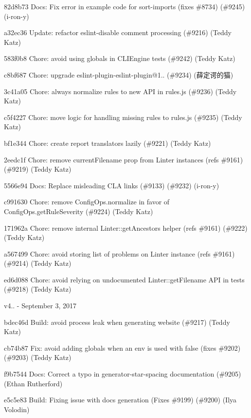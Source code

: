 \begin{DoxyItemize}
\item 82d8b73 Docs\+: Fix error in example code for sort-\/imports (fixes \#8734) (\#9245) (i-\/ron-\/y)
\item a32ec36 Update\+: refactor eslint-\/disable comment processing (\#9216) (Teddy Katz)
\item 583f0b8 Chore\+: avoid using globals in CLIEngine tests (\#9242) (Teddy Katz)
\item c8bf687 Chore\+: upgrade eslint-\/plugin-\/eslint-\/plugin@1.. (\#9234) (薛定谔的猫)
\item 3c41a05 Chore\+: always normalize rules to new API in rules.\+js (\#9236) (Teddy Katz)
\item c5f4227 Chore\+: move logic for handling missing rules to rules.\+js (\#9235) (Teddy Katz)
\item bf1e344 Chore\+: create report translators lazily (\#9221) (Teddy Katz)
\item 2eedc1f Chore\+: remove current\+Filename prop from Linter instances (refs \#9161) (\#9219) (Teddy Katz)
\item 5566e94 Docs\+: Replace misleading CLA links (\#9133) (\#9232) (i-\/ron-\/y)
\item c991630 Chore\+: remove Config\+Ops.\+normalize in favor of Config\+Ops.\+get\+Rule\+Severity (\#9224) (Teddy Katz)
\item 171962a Chore\+: remove internal Linter\+::get\+Ancestors helper (refs \#9161) (\#9222) (Teddy Katz)
\item a567499 Chore\+: avoid storing list of problems on Linter instance (refs \#9161) (\#9214) (Teddy Katz)
\item ed6d088 Chore\+: avoid relying on undocumented Linter\+::get\+Filename API in tests (\#9218) (Teddy Katz)
\end{DoxyItemize}

v4.. -\/ September 3, 2017


\begin{DoxyItemize}
\item bdec46d Build\+: avoid process leak when generating website (\#9217) (Teddy Katz)
\item cb74b87 Fix\+: avoid adding globals when an env is used with {\ttfamily false} (fixes \#9202) (\#9203) (Teddy Katz)
\item f9b7544 Docs\+: Correct a typo in generator-\/star-\/spacing documentation (\#9205) (Ethan Rutherford)
\item e5c5e83 Build\+: Fixing issue with docs generation (Fixes \#9199) (\#9200) (Ilya Volodin)
\end{DoxyItemize}

